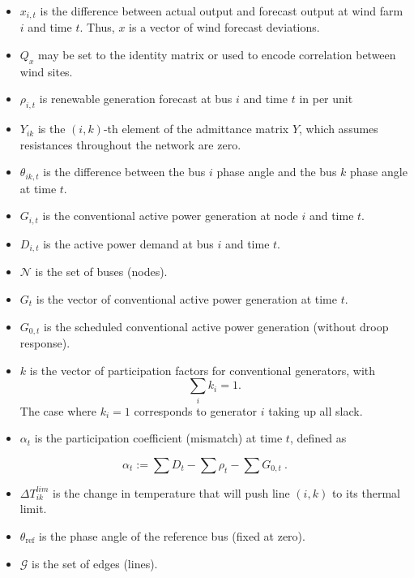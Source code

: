 \documentclass[conference]{IEEEtran}
\begin{document}
\begin{itemize}
\itemsep1pt\parskip0pt
\item $x_{i,t}$ is the difference between actual output and forecast output at wind farm $i$ and time $t$. Thus, $x$ is a vector of wind forecast deviations.
\item $Q_x$ may be set to the identity matrix or used to encode correlation between wind sites.
\item $\rho_{i,t}$ is renewable generation forecast at bus $i$ and time $t$ in per unit 
\item $Y_{ik}$ is the $(i,k)$-th element of the admittance matrix $Y$, which
  assumes resistances throughout the network are zero.
\item $\theta_{ik,t}$ is the difference between the bus $i$ phase angle and the bus $k$ phase angle at time $t$.
\item $G_{i,t}$ is the conventional active power generation at node $i$ and time $t$.
\item $D_{i,t}$ is the active power demand at bus $i$ and time $t$.
\item $\mathcal{N}$ is the set of buses (nodes).
\item $G_t$ is the vector of conventional active power generation at time $t$.
\item $G_{0,t}$ is the scheduled conventional active power generation (without droop response).
\item $k$ is the vector of participation factors for conventional
  generators, with
\begin{equation}
\label{I:part} \sum_i k_i = 1.
\end{equation}
The case where $k_i=1$ corresponds to generator $i$ taking up all
  slack.
\item $\alpha_t$ is the participation coefficient (mismatch) at time $t$, defined as
\end{itemize}

\[\alpha_t:= \sum D_t - \sum \rho_t - \sum G_{0,t} ~.\]

\begin{itemize}
\itemsep1pt\parskip0pt
\item $\Delta T_{ik}^{lim}$ is the change in temperature that will push line $(i,k)$ to its thermal limit.
\item $\theta_\text{ref}$ is the phase angle of the reference bus (fixed at zero).
\item $\mathcal{G}$ is the set of edges (lines).
\end{itemize}
\end{document}
